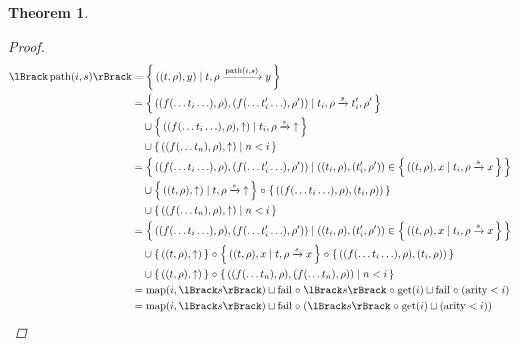 \documentclass{article}
\newtheorem{theorem}{Theorem}
\newcommand{\fail}{\ensuremath \text{$\uparrow$}}
\newcommand{\path}[2]{\ensuremath \operatorname{path}(#1,#2)}
\newcommand{\transform}[5]{#1, #2 \xrightarrow{#3} #4, #5}
\newcommand{\transformx}[4]{#1, #2 \xrightarrow{#3} #4}
\newcommand{\transformfail}[3]{#1, #2 \xrightarrow{#3} \fail}
\newcommand{\sem}[1]{\ensuremath \lBrack #1 \rBrack}
\newcommand{\setbuild}[2]{\ensuremath \left\{\, #1 \mid #2 \,\right\}}
\newcommand{\setbuildc}[1]{\ensuremath \left\{\, #1 \,\right\}}
\newcommand{\lfail}{\ensuremath \operatorname{fail}}
\newcommand{\get}{\ensuremath \operatorname{get}}
\newcommand{\map}{\ensuremath \operatorname{map}}
\newcommand{\arity}{\ensuremath \operatorname{arity}}
\newcommand{\comp}{\ensuremath \mathrel{\circ}}
\begin{document}
\begin{theorem}
\begin{proof}
\begin{align*}
  \sem{\path{i}{s}}
    &= \setbuild{((t,\rho),y)}{\transformx{t}{\rho}{\path{i}{s}}{y}} \\
    &= \setbuild{((f(\ldots t_i \ldots),\rho),(f(\ldots t_i' \ldots),\rho'))}{\transform{t_i}{\rho}{s}{t_i'}{\rho'}} \\
    &\quad \cup {\setbuild{((f(\ldots t_i \ldots),\rho),\fail)}{\transformfail{t_i}{\rho}{s}}} \\
    &\quad \cup {\setbuild{((f(\ldots t_n),\rho),\fail)}{ n < i }} \\
    &= \setbuild{ ((f(\ldots t_i \ldots),\rho),(f(\ldots t_i' \ldots),\rho')) }{ ((t_i,\rho),(t_i',\rho')) \in \setbuild{ ((t,\rho),x }{ \transformx{t_i}{\rho}{s}{x} } } \\
    &\quad \cup {\setbuild{((t,\rho),\fail)}{\transformfail{t}{\rho}{s}}} \comp {\setbuildc{((f(\ldots t_i \ldots),\rho),(t_i,\rho))}} \\
    &\quad \cup {\setbuild{((f(\ldots t_n),\rho),\fail)}{ n < i }} \\
    &= \setbuild{ ((f(\ldots t_i \ldots),\rho),(f(\ldots t_i' \ldots),\rho')) }{ ((t_i,\rho),(t_i',\rho')) \in \setbuild{ ((t,\rho),x }{ \transformx{t_i}{\rho}{s}{x} } } \\
    &\quad \cup {\setbuildc{((t,\rho),\fail)}} \comp {\setbuild{((t,\rho),x}{\transformx{t}{\rho}{s}{x}}} \comp {\setbuildc{((f(\ldots t_i \ldots),\rho),(t_i,\rho))}} \\
    &\quad \cup {\setbuildc{((t,\rho),\fail)}} \comp {\setbuild{((f(\ldots t_n),\rho),(f(\ldots t_n),\rho))}{ n < i }} \\
    &= \map(i,\sem{s}) \sqcup \lfail \comp \sem{s} \comp \get(i) \sqcup \lfail \comp {(\arity < i)} \\
    &= \map(i,\sem{s}) \sqcup \lfail \comp (\sem{s} \comp \get(i) \sqcup (\arity < i))
\end{align*}


\end{proof}
\end{theorem}
\end{document}

